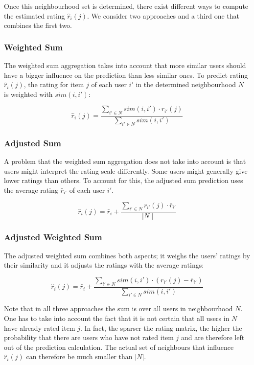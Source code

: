 Once this neighbourhood set is determined, there exist different ways to compute the estimated rating $\hat{r}_i(j)$. We consider two approaches and a third one that combines the first two.

\subsubsection{Weighted Sum}
\label{ssst:weightedsum} The weighted sum aggregation takes into account that more similar users should have a bigger influence on the prediction than less similar ones. To predict rating $\hat{r}_i(j)$, the rating for item $j$ of each user $i'$ in the determined neighbourhood $N$ is weighted with $sim(i,i')$:

\begin{equation}
\hat{r}_i(j) = \frac{\sum_{i' \in N}{sim(i,i')\cdot r_{i'}(j)}}{\sum_{i' \in N}{sim(i,i')}}
\label{eq:weightedsum}
\end{equation}

\subsubsection{Adjusted Sum}
\label{ssst:adjustedsum} A problem that the weighted sum aggregation does not take into account is that users might interpret the rating scale differently. Some users might generally give lower ratings than others. To account for this, the adjusted sum prediction uses the average rating $\bar{r}_{i'}$ of each user $i'$.

\begin{equation}
\hat{r}_i(j) = \bar{r}_i + \frac{\sum_{i' \in N}{r_{i'}(j)\cdot \bar{r}_{i'}}}{\mid N\mid}
\label{eq:adjustedsum}
\end{equation}

\subsubsection{Adjusted Weighted Sum}
\label{ssst:adjustedweightedsum} The adjusted weighted sum combines both aspects; it weighs the users' ratings by their similarity and it adjusts the ratings with the average ratings:

\begin{equation}
\hat{r}_i(j) =  \bar{r}_i + \frac{\sum_{i' \in N}{sim(i,i')\cdot (r_{i'}(j) - \bar{r}_{i'})}}{\sum_{i' \in N}{sim(i,i')}}
\label{eq:adjustedweightedsum}
\end{equation}

Note that in all three approaches the sum is over all users in neighbourhood $N$. One has to take into account the fact that it is not certain that all users in $N$ have already rated item $j$. In fact, the sparser the rating matrix, the higher the probability that there are users who have not rated item $j$ and are therefore left out of the prediction calculation. The actual set of neighbours that influence $\hat{r}_i(j)$ can therefore be much smaller than $\lvert N \rvert$.

